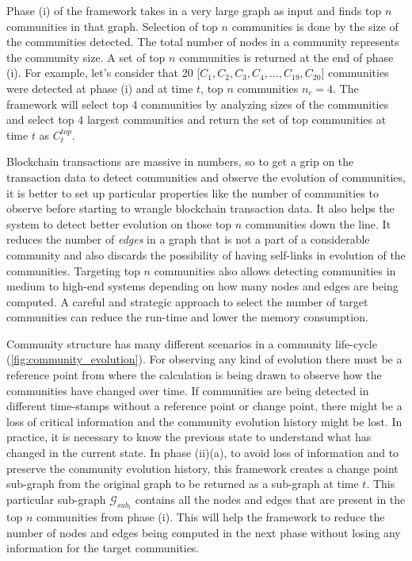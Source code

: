 Phase (i) of the framework takes in a very large graph as input and finds top $n$ communities in that graph.  Selection of top $n$ communities is done by the size of the communities detected. The total number of nodes in a community represents the community size. A set of top $n$ communities is returned at the end of phase (i). For example, let's consider that 20 [$C_1, C_2, C_3, C_4, \ldots , C_{19}, C_{20}$] communities were detected at phase (i) and at time $t$, top $n$ communities $n_{c} = 4$. The framework will select top $4$ communities by analyzing sizes of the communities and select top $4$ largest communities and return the set of top communities at time  $t$ as $C_t^{top}$. 

Blockchain transactions are massive in numbers, so to get a grip on the transaction data to detect communities and observe the evolution of communities, it is better to set up particular properties like the number of communities to observe before starting to wrangle blockchain transaction data. It also helps the system to detect better evolution on those top $n$ communities down the line. It reduces the number of \textit{edges} in a graph that is not a part of a considerable community and also discards the possibility of having self-links in evolution of the communities. Targeting top $n$ communities also allows detecting communities in medium to high-end systems depending on how many nodes and edges are being computed. A careful and strategic approach to select the number of target communities can reduce the run-time and lower the memory consumption.

Community structure has many different scenarios in a community life-cycle (\ref{fig:community_evolution}). For observing any kind of evolution there must be a reference point from where the calculation is being drawn to observe how the communities have changed over time. If communities are being detected in different time-stamps without a reference point or change point, there might be a loss of critical information and the community evolution history might be lost. In practice, it is necessary to know the previous state to understand what has changed in the current state. In phase (ii)(a), to avoid loss of information and to preserve the community evolution history, this framework creates a change point sub-graph from the original graph to be returned as a sub-graph at time $t$. This particular sub-graph $\mathcal{G}_{sub_{t}}$ contains all the nodes and edges that are present in the top $n$ communities from phase (i). This will help the framework to reduce the number of nodes and edges being computed in the next phase without losing any information for the target communities.

